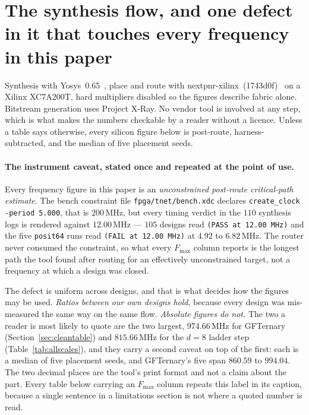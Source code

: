 \documentclass[11pt]{article}
\theoremstyle{definition}
\begin{document}
\section{The synthesis flow, and one defect in it that touches every frequency
in this paper}\label{sec:hardware}

Synthesis with Yosys~0.65~\cite{yosys}, place and route with
nextpnr-xilinx~(1743d0f)~\cite{nextpnr} on a Xilinx XC7A200T, hard multipliers
disabled so the figures describe fabric alone. Bitstream generation uses Project
X-Ray. No vendor tool is involved at any step, which is what makes the numbers
checkable by a reader without a licence. Unless a table says otherwise, every
silicon figure below is post-route, harness-subtracted, and the median of five
placement seeds.

\paragraph{The instrument caveat, stated once and repeated at the point of use.}
Every frequency figure in this paper is an \emph{unconstrained post-route
critical-path estimate}. The bench constraint file \texttt{fpga/tnet/bench.xdc}
declares \verb|create_clock -period 5.000|, that is $200$\,MHz, but every timing
verdict in the $110$ synthesis logs is rendered against $12.00$\,MHz --- $105$
designs read \texttt{(PASS at 12.00 MHz)} and the five \texttt{posit64} runs read
\texttt{(FAIL at 12.00 MHz)} at $4.92$ to $6.82$\,MHz. The router never consumed
the constraint, so what every $F_{\max}$ column reports is the longest path the
tool found after routing for an effectively unconstrained target, not a frequency
at which a design was closed.

The defect is uniform across designs, and that is what decides how the figures
may be used. \emph{Ratios between our own designs hold}, because every design was
mis-measured the same way on the same flow. \emph{Absolute figures do not.} The
two a reader is most likely to quote are the two largest, $974.66$\,MHz for
GFTernary (Section~\ref{sec:cleantable}) and $815.66$\,MHz for the $d{=}8$ ladder
step (Table~\ref{tab:allscales}), and they carry a second caveat on top of the
first: each is a median of five placement seeds, and GFTernary's five span
$860.59$ to $994.04$. The two decimal places are the tool's print format and not
a claim about the part. Every table below carrying an $F_{\max}$ column repeats
this label in its caption, because a single sentence in a limitations section is
not where a quoted number is read.
\end{document}
